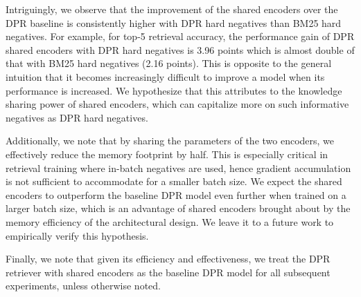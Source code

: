 %
Intriguingly, we observe that the improvement of the shared encoders over the DPR baseline is consistently higher with DPR hard negatives than BM25 hard negatives.
%
For example, for top-5 retrieval accuracy, the performance gain of DPR shared encoders with DPR hard negatives is 3.96 points which is almost double of that with BM25 hard negatives (2.16 points).
%
This is opposite to the general intuition that it becomes increasingly difficult to improve a model when its performance is increased.
%
We hypothesize that this attributes to the knowledge sharing power of shared encoders, which can capitalize more on such informative negatives as DPR hard negatives.

%
Additionally, we note that by sharing the parameters of the two encoders, we effectively reduce the memory footprint by half.
%
This is especially critical in retrieval training where in-batch negatives are used, hence gradient accumulation is not sufficient to accommodate for a smaller batch size.
%
We expect the shared encoders to outperform the baseline DPR model even further when trained on a larger batch size, which is an advantage of shared encoders brought about by the memory efficiency of the architectural design.
%
We leave it to a future work to empirically verify this hypothesis.

%
Finally, we note that given its efficiency and effectiveness, we treat the DPR retriever with shared encoders as the baseline DPR model for all subsequent experiments, unless otherwise noted.